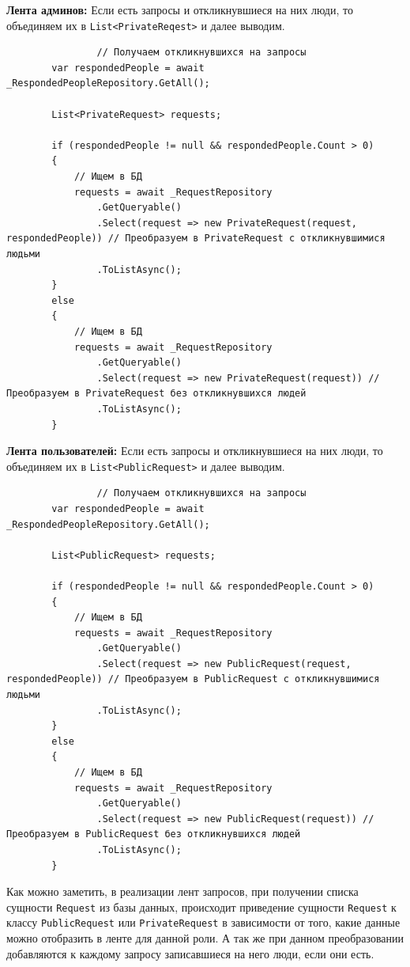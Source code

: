 \textbf{Лента админов:} Если есть запросы и откликнувшиеся на них люди, то объединяем их в \texttt{List<PrivateReqest>} и далее выводим.
\begin{verbatim}
				// Получаем откликнувшихся на запросы
        var respondedPeople = await _RespondedPeopleRepository.GetAll();

        List<PrivateRequest> requests;

        if (respondedPeople != null && respondedPeople.Count > 0)
        {
            // Ищем в БД
            requests = await _RequestRepository
                .GetQueryable()
                .Select(request => new PrivateRequest(request, respondedPeople)) // Преобразуем в PrivateRequest с откликнувшимися людьми
                .ToListAsync();
        }
        else
        {
            // Ищем в БД
            requests = await _RequestRepository
                .GetQueryable()
                .Select(request => new PrivateRequest(request)) // Преобразуем в PrivateRequest без откликнувшихся людей
                .ToListAsync();
        }
\end{verbatim}

\textbf{Лента пользователей:}  Если есть запросы и откликнувшиеся на них люди, то объединяем их в \texttt{List<PublicRequest>} и далее выводим.
\begin{verbatim}
				// Получаем откликнувшихся на запросы
        var respondedPeople = await _RespondedPeopleRepository.GetAll();

        List<PublicRequest> requests;

        if (respondedPeople != null && respondedPeople.Count > 0)
        {
            // Ищем в БД
            requests = await _RequestRepository
                .GetQueryable()
                .Select(request => new PublicRequest(request, respondedPeople)) // Преобразуем в PublicRequest с откликнувшимися людьми
                .ToListAsync();
        }
        else
        {
            // Ищем в БД
            requests = await _RequestRepository
                .GetQueryable()
                .Select(request => new PublicRequest(request)) // Преобразуем в PublicRequest без откликнувшихся людей
                .ToListAsync();
        }
\end{verbatim}

Как можно заметить, в реализации лент запросов, при получении списка сущности \texttt{Request} из базы данных, происходит приведение сущности \texttt{Request} к классу \texttt{PublicRequest} или \texttt{PrivateRequest} в зависимости от того, какие данные можно отобразить в ленте для данной роли. А так же при данном преобразовании добавляются к каждому запросу записавшиеся на него люди, если они есть.


